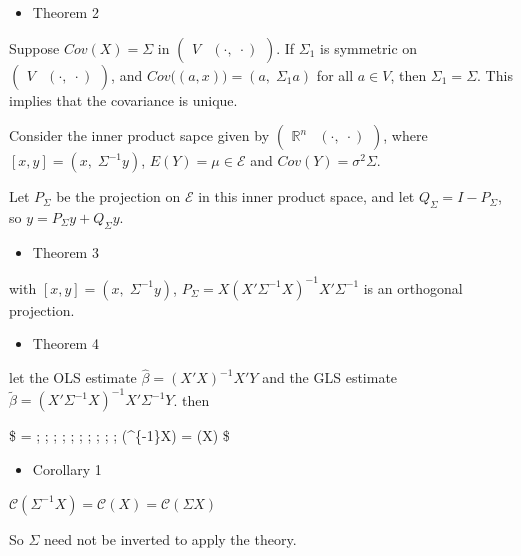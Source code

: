 \documentclass[
]{book}
\providecommand{\tightlist}{%
  \setlength{\itemsep}{0pt}\setlength{\parskip}{0pt}}
\begin{document}
{{{\begin{itemize}
\tightlist
\item
  Theorem 2
\end{itemize}

Suppose \(Cov(X) = \Sigma\) in \(\begin{pmatrix} V & (\cdot, \; \cdot) \end{pmatrix}\). If \(\Sigma_1\) is symmetric on \(\begin{pmatrix} V & (\cdot, \; \cdot) \end{pmatrix}\), and \(Cov \Big( (a,x) \Big) = (a, \; \Sigma_1 a)\) for all \(a \in V\), then \(\Sigma_1 = \Sigma\). This implies that the covariance is unique.

Consider the inner product sapce given by \(\begin{pmatrix} \mathbb{R}^n & (\cdot, \; \cdot) \end{pmatrix}\), where \([x,y] = (x, \; \Sigma^{-1}y)\), \(E(Y)=\mu \in \mathcal{E}\) and \(Cov(Y) = \sigma^2 \Sigma\).

Let \(P_\Sigma\) be the projection on \(\mathcal{E}\) in this inner product space, and let \(Q_\Sigma = I - P_\Sigma\), so \(y = P_{\Sigma} y + Q_{\Sigma} y\).

\begin{itemize}
\tightlist
\item
  Theorem 3
\end{itemize}

with \([x,y] = (x, \; \Sigma^{-1}y)\), \(P_\Sigma = X(X'\Sigma^{-1} X )^{-1} X' \Sigma^{-1}\) is an orthogonal projection.

\begin{itemize}
\tightlist
\item
  Theorem 4
\end{itemize}

let the OLS estimate \(\hat \beta = (X'X)^{-1}X'Y\) and the GLS estimate \(\tilde \beta = (X'\Sigma^{-1}X)^{-1} X' \Sigma^{-1}Y\). then

\$
\hat \beta = \tilde \beta ; ; ; ; ; \iff ; ; ; ; ; (\Sigma\^{}\{-1\}X) = (X)
\$

\begin{itemize}
\tightlist
\item
  Corollary 1
\end{itemize}

\(\mathcal{C}(\Sigma^{-1}X) = \mathcal{C}(X)= \mathcal{C}(\Sigma X)\)

So \(\Sigma\) need not be inverted to apply the theory.

}}}
\end{document}

